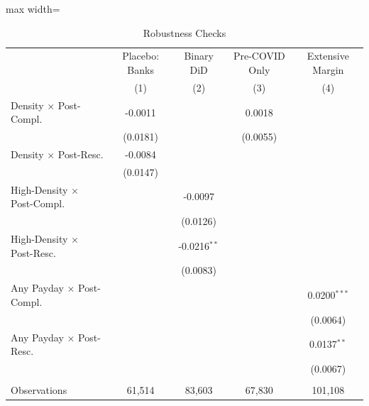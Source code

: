 \begin{table}[htbp]
   \caption{\label{tab:robust} Robustness Checks}
   \bigskip
   \centering
   \begin{adjustbox}{max width=\textwidth}
   \begin{tabular}{lcccc}
      \toprule
                                         & Placebo: Banks        & Binary DiD     & Pre-COVID Only       & Extensive Margin \\   
                                         & (1)                   & (2)            & (3)                  & (4)\\  
      \midrule 
      Density $\times$ Post-Compl.       & -0.0011               &                & 0.0018               &   \\   
                                         & (0.0181)              &                & (0.0055)             &   \\   
      Density $\times$ Post-Resc.        & -0.0084               &                &                      &   \\   
                                         & (0.0147)              &                &                      &   \\   
      High-Density $\times$ Post-Compl.  &                       & -0.0097        &                      &   \\   
                                         &                       & (0.0126)       &                      &   \\   
      High-Density $\times$ Post-Resc.   &                       & -0.0216$^{**}$ &                      &   \\   
                                         &                       & (0.0083)       &                      &   \\   
      Any Payday $\times$ Post-Compl.    &                       &                &                      & 0.0200$^{***}$\\   
                                         &                       &                &                      & (0.0064)\\   
      Any Payday $\times$ Post-Resc.     &                       &                &                      & 0.0137$^{**}$\\   
                                         &                       &                &                      & (0.0067)\\   
       \\
      Observations                       & 61,514                & 83,603         & 67,830               & 101,108\\  

\end{tabular}
\end{adjustbox}
\end{table}
